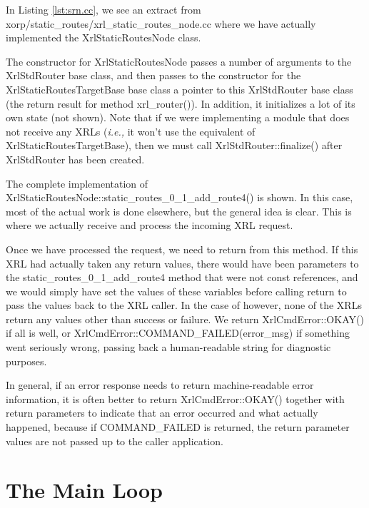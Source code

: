 \documentclass[11pt]{article}
\newcommand{\ie}{\emph{i.e.,}\xspace}
\begin{document}
In Listing \ref{lst:srn.cc}, we see an extract from {\stt
xorp/static\_routes/xrl\_static\_routes\_node.cc} where we have
actually implemented the {\stt XrlStaticRoutesNode} class.  

The constructor for {\stt XrlStaticRoutesNode} passes
a number of arguments to the {\stt XrlStdRouter} base class,
and then passes to the constructor for the {\stt
XrlStaticRoutesTargetBase} base class a pointer to this {\stt XrlStdRouter}
base class (the return result for method {\stt xrl\_router()}).
In addition, it initializes a lot of its own state (not shown).
Note that if we were implementing a module that does not receive any XRLs (\ie
it won't use the equivalent of {\stt XrlStaticRoutesTargetBase}), then
we must call {\stt XrlStdRouter::finalize()} after {\stt XrlStdRouter}
has been created.

The complete implementation of {\stt
XrlStaticRoutesNode::static\_routes\_0\_1\_add\_route4()} is shown.  In
this case, most of the actual work is done elsewhere, but the general
idea is clear.  This is where we actually receive and process the
incoming XRL request.  

Once we have processed the request, we need to return from this
method.  If this XRL had actually taken any return values, there would
have been parameters to the {\stt static\_routes\_0\_1\_add\_route4}
method that were not {\stt const} references, and we would simply have
set the values of these variables before calling {\stt return} to pass
the values back to the XRL caller.  In the case of \SRI however, none
of the XRLs return any values other than success or failure.  We
return {\stt XrlCmdError::OKAY()} if all is well, or {\stt
XrlCmdError::COMMAND\_FAILED(error\_msg)} if something went seriously
wrong, passing back a human-readable string for diagnostic purposes.

In general, if an error response needs to return machine-readable
error information, it is often better to return {\stt
XrlCmdError::OKAY()} together with return parameters to indicate that
an error occurred and what actually happened, because if {\stt
COMMAND\_FAILED} is returned, the return parameter values are not
passed up to the caller application.

\newpage

\section{The Main Loop}
\label{main}
\end{document}
